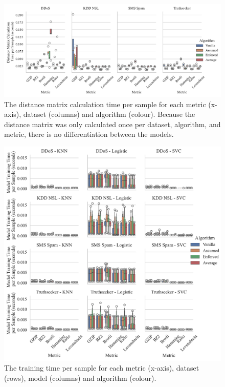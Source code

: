 \documentclass[conference]{IEEEtran}
\begin{document}
\begin{figure}[htb]
    \includegraphics[width=\textwidth]{images/distance_matrix_time_vs_algorithm.pdf}
    \caption{The distance matrix calculation time per sample for each metric (x-axis), dataset (columns) and algorithm (colour). Because the distance matrix was only calculated once per dataset, algorithm, and metric, there is no differentiation between the models.}
    \label{fig:distance_time}
\end{figure}

\begin{figure}[htb]
    \includegraphics[width=\textwidth]{images/train_time_vs_algorithm.pdf}
    \caption{The training time per sample for each metric (x-axis), dataset (rows), model (columns) and algorithm (colour).}
    \label{fig:train_time}
\end{figure}
\end{document}
